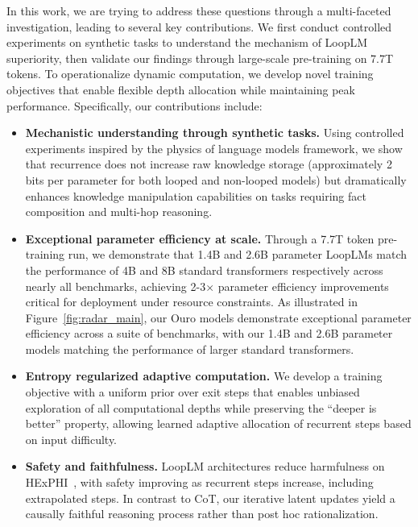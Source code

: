 \documentclass[]{bytedance_seed}
\newcommand{\1}{\mathbf{1}}
\newcommand{\ut}{LoopLM}
\begin{document}
In this work, we are trying to address these questions through a multi-faceted investigation, leading to several key contributions. We first conduct controlled experiments on synthetic tasks to understand the mechanism of \ut{} superiority, then validate our findings through large-scale pre-training on 7.7T tokens. To operationalize dynamic computation, we develop novel training objectives that enable flexible depth allocation while maintaining peak performance. Specifically, our contributions include:
\begin{itemize}
\item \textbf{Mechanistic understanding through synthetic tasks.} Using controlled experiments inspired by the physics of language models framework, we show that recurrence does not increase raw knowledge storage (approximately 2 bits per parameter for both looped and non-looped models) but dramatically enhances knowledge manipulation capabilities on tasks requiring fact composition and multi-hop reasoning.
\item \textbf{Exceptional parameter efficiency at scale.} Through a 7.7T token pre-training run, we demonstrate that 1.4B and 2.6B parameter \ut{}s match the performance of 4B and 8B standard transformers respectively across nearly all benchmarks, achieving 2-3$\times$ parameter efficiency improvements critical for deployment under resource constraints. As illustrated in Figure~\ref{fig:radar_main}, our Ouro models demonstrate exceptional parameter efficiency across a suite of benchmarks, with our 1.4B and 2.6B parameter models matching the performance of larger standard transformers.
\item \textbf{Entropy regularized adaptive computation.} We develop a training objective with a uniform prior over exit steps that enables unbiased exploration of all computational depths while preserving the ``deeper is better'' property, allowing learned adaptive allocation of recurrent steps based on input difficulty.

\item \textbf{Safety and faithfulness.} \ut{} architectures reduce harmfulness on HEx\text{-}PHI~\citep{qifine}, with safety improving as recurrent steps increase, including extrapolated steps. In contrast to CoT, our iterative latent updates yield a causally faithful reasoning process rather than post hoc rationalization.
\end{itemize}
\end{document}
